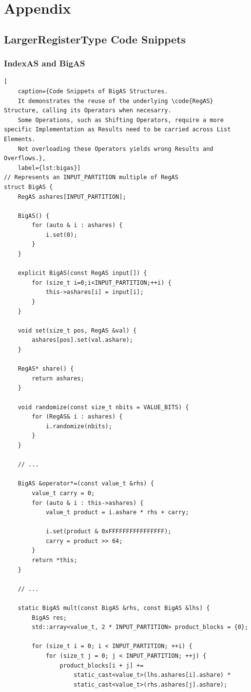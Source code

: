 \chapter{Appendix}\label{chap:appendix}
\section{LargerRegisterType Code Snippets}
\subsection*{IndexAS and BigAS}
\begin{lstlisting}[
    caption={Code Snippets of BigAS Structures. 
    It demonstrates the reuse of the underlying \code{RegAS} Structure, calling its Operators when necesarry.
    Some Operations, such as Shifting Operators, require a more specific Implementation as Results need to be carried across List Elements.
    Not overloading these Operators yields wrong Results and Overflows.}, 
    label={lst:bigas}]
// Represents an INPUT_PARTITION multiple of RegAS
struct BigAS {
    RegAS ashares[INPUT_PARTITION];

    BigAS() {
        for (auto & i : ashares) {
            i.set(0);
        }
    }

    explicit BigAS(const RegAS input[]) {
        for (size_t i=0;i<INPUT_PARTITION;++i) {
            this->ashares[i] = input[i];
        }
    }

    void set(size_t pos, RegAS &val) {
        ashares[pos].set(val.ashare);
    }

    RegAS* share() {
        return ashares;
    }

    void randomize(const size_t nbits = VALUE_BITS) {
        for (RegAS& i : ashares) {
            i.randomize(nbits);
        }
    }

    // ...

    BigAS &operator*=(const value_t &rhs) {
        value_t carry = 0;
        for (auto & i : this->ashares) {
            value_t product = i.ashare * rhs + carry;

            i.set(product & 0xFFFFFFFFFFFFFFFF);
            carry = product >> 64;
        }
        return *this;
    }

    // ...

    static BigAS mult(const BigAS &rhs, const BigAS &lhs) {
        BigAS res;
        std::array<value_t, 2 * INPUT_PARTITION> product_blocks = {0};

        for (size_t i = 0; i < INPUT_PARTITION; ++i) {
            for (size_t j = 0; j < INPUT_PARTITION; ++j) {
                product_blocks[i + j] +=
                    static_cast<value_t>(lhs.ashares[i].ashare) *
                    static_cast<value_t>(rhs.ashares[j].ashare);


\end{lstlisting}
